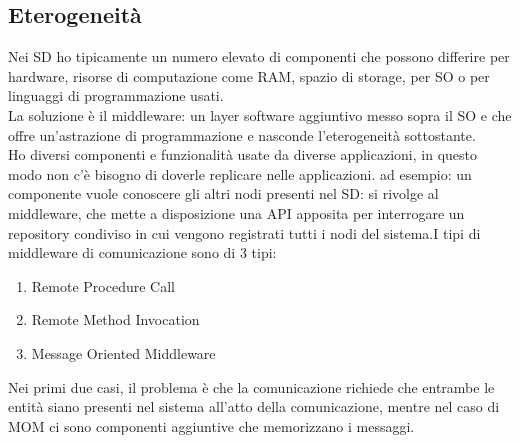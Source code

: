 \documentclass{article}
\begin{document}
\subsection{Eterogeneità}
Nei SD ho tipicamente un numero elevato di componenti che possono differire per hardware, risorse di computazione come RAM, spazio di storage, per SO o per linguaggi di programmazione usati.\\La soluzione è il middleware: un layer software aggiuntivo messo sopra il SO e che offre un'astrazione di programmazione e nasconde l'eterogeneità sottostante.\\Ho diversi componenti e funzionalità usate da diverse applicazioni, in questo modo non c'è bisogno di doverle replicare nelle applicazioni.
ad esempio: un componente vuole conoscere gli altri nodi presenti nel SD: si rivolge al middleware, che mette a disposizione una API apposita per interrogare un repository condiviso in cui vengono registrati tutti i nodi del sistema.I tipi di middleware di comunicazione sono di 3 tipi:
\begin{enumerate}
\item Remote Procedure Call
\item Remote Method Invocation
\item Message Oriented Middleware
\end{enumerate}
Nei primi due casi, il problema è che la comunicazione richiede che entrambe le entità siano presenti nel sistema all'atto della comunicazione, mentre nel caso di MOM ci sono componenti aggiuntive che memorizzano i messaggi.
\end{document}
